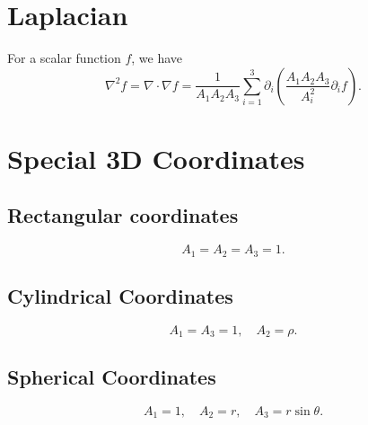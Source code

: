 \documentclass{article}
\theoremstyle{1}
\theoremstyle{2}
\newcommand{\pa}{\partial}
\begin{document}
\section{Laplacian}
For a scalar function $f$, we have
\begin{equation}
    \nabla^2f=\nabla\cdot\nabla f=\frac{1}{A_1A_2A_3}\sum_{i=1}^{3}\pa_i\left(\frac{A_1A_2A_3}{A_i^2}\pa_i f\right).
\end{equation}
\section{Special 3D Coordinates}
\subsection{Rectangular coordinates}
\begin{equation}
    A_1=A_2=A_3=1.
\end{equation}
\subsection{Cylindrical Coordinates}
\begin{equation}
    A_1=A_3=1,\quad A_2=\rho.
\end{equation}
\subsection{Spherical Coordinates}
\begin{equation}
    A_1=1,\quad A_2=r,\quad A_3=r \sin\theta.
\end{equation}
\end{document}
